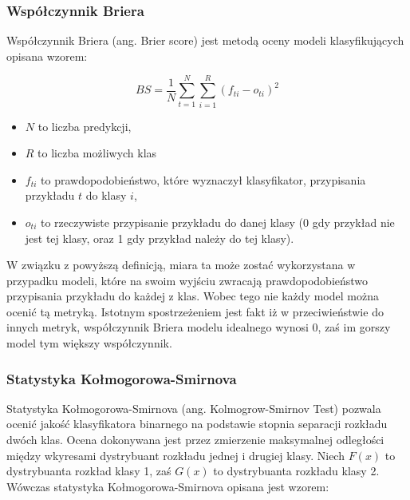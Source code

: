 \documentclass[a4paper, twoside, 11pt, openright]{article}
\begin{document}




\subsubsection{Współczynnik Briera \cite{brier}}

Współczynnik Briera (ang. Brier score) jest metodą oceny modeli klasyfikujących opisana wzorem:

$$	BS=\frac{1}{N} \sum_{t=1}^{N} \sum_{i=1}^{R}(f_{ti}-o_{ti})^2 $$

\begin{itemize}
\item $N$ to liczba predykcji,
\item $R$  to liczba możliwych klas
\item $f_{ti}$ to prawdopodobieństwo, które wyznaczył klasyfikator, przypisania przykładu $t$ do klasy $i$,
\item $o_{ti}$ to rzeczywiste przypisanie przykładu do danej klasy (0 gdy przykład nie jest tej klasy, oraz 1 gdy przykład należy do tej klasy).
\end{itemize}

W związku z powyższą definicją, miara ta może zostać wykorzystana w przypadku modeli, które na swoim wyjściu zwracają prawdopodobieństwo przypisania przykładu do każdej z klas. Wobec tego nie każdy model można ocenić tą metryką. Istotnym spostrzeżeniem jest fakt iż w przeciwieństwie do innych metryk, współczynnik Briera modelu idealnego wynosi $0$, zaś im gorszy model tym większy współczynnik.


\subsubsection{Statystyka Kołmogorowa-Smirnova}

Statystyka Kołmogorowa-Smirnova (ang. Kolmogrow-Smirnov Test) pozwala ocenić jakość klasyfikatora binarnego na podstawie stopnia separacji rozkładu dwóch klas. Ocena dokonywana jest przez zmierzenie maksymalnej odległości między wkyresami dystrybuant rozkładu jednej i drugiej klasy. Niech $F(x)$ to dystrybuanta rozkład klasy 1, zaś $G(x)$ to dystrybuanta rozkładu klasy 2. Wówczas statystyka Kołmogorowa-Smirnova opisana jest wzorem:
\end{document}
